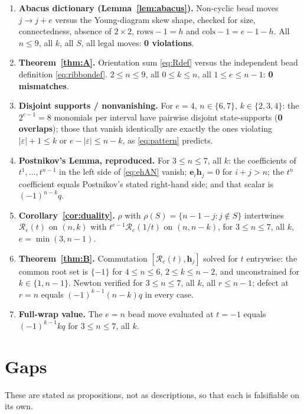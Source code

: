 \documentclass[11pt]{article}
\theoremstyle{plain}
\theoremstyle{definition}
\begin{document}
\begin{enumerate}
\item \textbf{Abacus dictionary (Lemma~\ref{lem:abacus}).}  Non-cyclic
bead moves $j\to j+e$ versus the Young-diagram skew shape, checked for
size, connectedness, absence of $2\times2$, $\text{rows}-1=h$ and
$\text{cols}-1=e-1-h$.  All $n\le 9$, all $k$, all $S$, all legal moves:
\textbf{0 violations}.
\item \textbf{Theorem~\ref{thm:A}.}  Orientation sum \eqref{eq:Rdef}
versus the independent bead definition \eqref{eq:ribbondef}.
$2\le n\le 9$, all $0\le k\le n$, all $1\le e\le n-1$:
\textbf{0 mismatches}.
\item \textbf{Disjoint supports / nonvanishing.}  For $e=4$,
$n\in\{6,7\}$, $k\in\{2,3,4\}$: the $2^{e-1}=8$ monomials per interval
have pairwise disjoint state-supports (\textbf{0 overlaps}); those that
vanish identically are exactly the ones violating $|\varepsilon|+1\le k$
or $e-|\varepsilon|\le n-k$, as \eqref{eq:pattern} predicts.
\item \textbf{Postnikov's Lemma, reproduced.}  For $3\le n\le 7$, all
$k$: the coefficients of $t^1,\dots,t^{n-1}$ in the left side of
\eqref{eq:ehAN} vanish; $\mathbf e_i\mathbf h_j=0$ for $i+j>n$; the
$t^n$ coefficient equals Postnikov's stated right-hand side; and that
scalar is $(-1)^{n-k}q$.
\item \textbf{Corollary~\ref{cor:duality}.}  $\rho$ with
$\rho(S)=\{n-1-j:j\notin S\}$ intertwines $\mathcal R_e(t)$ on
$(n,k)$ with $t^{e-1}\mathcal R_e(1/t)$ on $(n,n-k)$, for
$3\le n\le7$, all $k$, $e=\min(3,n-1)$.
\item \textbf{Theorem~\ref{thm:B}.}  Commutation
$[\mathcal R_e(t),\mathbf h_j]$ solved for $t$ entrywise: the common root
set is $\{-1\}$ for $4\le n\le6$, $2\le k\le n-2$, and unconstrained for
$k\in\{1,n-1\}$.  Newton verified for $3\le n\le7$, all $k$, all
$r\le n-1$; defect at $r=n$ equals $(-1)^{k-1}(n-k)q$ in every case.
\item \textbf{Full-wrap value.}  The $e=n$ bead move evaluated at $t=-1$
equals $(-1)^{k-1}kq$ for $3\le n\le7$, all $k$.
\end{enumerate}

\section{Gaps}

These are stated as propositions, not as descriptions, so that each is
falsifiable on its own.
\end{document}
